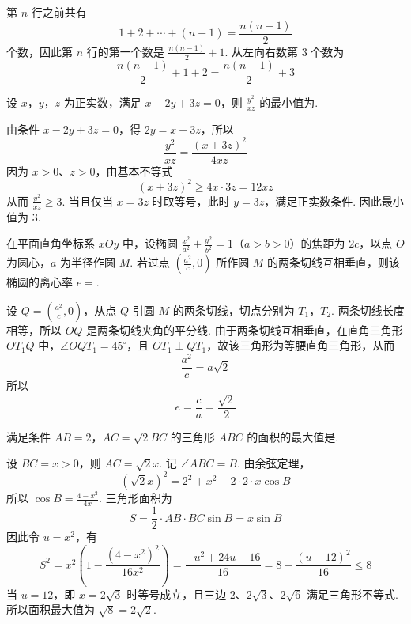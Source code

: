 
\begin{solution}
第 \(n\) 行之前共有
\[
1+2+\cdots+(n-1)=\frac{n(n-1)}{2}
\]
个数，因此第 \(n\) 行的第一个数是 \(\frac{n(n-1)}{2}+1\). 从左向右数第 \(3\) 个数为
\[
\frac{n(n-1)}{2}+1+2=\frac{n(n-1)}{2}+3
\]
\end{solution}

\begin{problem}
设 \(x\)，\(y\)，\(z\) 为正实数，满足 \(x - 2y + 3z = 0\)，则 \(\frac{y^2}{xz}\) 的最小值为\fillinblank{}.
\end{problem}


\begin{solution}
由条件 \(x-2y+3z=0\)，得 \(2y=x+3z\)，所以
\[
\frac{y^2}{xz}=\frac{(x+3z)^2}{4xz}
\]
因为 \(x>0\)、\(z>0\)，由基本不等式
\[
(x+3z)^2\geqslant4x\cdot3z=12xz
\]
从而 \(\frac{y^2}{xz}\geqslant3\). 当且仅当 \(x=3z\) 时取等号，此时 \(y=3z\)，满足正实数条件. 因此最小值为 \(3\).
\end{solution}

\begin{problem}
在平面直角坐标系 \(xOy\) 中，设椭圆 \(\frac{x^2}{a^2} + \frac{y^2}{b^2} = 1\)（\(a > b > 0\)）的焦距为 \(2c\)，以点 \(O\) 为圆心，\(a\) 为半径作圆 \(M\). 若过点 \(\left(\frac{a^2}{c}, 0\right)\) 所作圆 \(M\) 的两条切线互相垂直，则该椭圆的离心率 \(e = \)\fillinblank{}.
\end{problem}


\begin{solution}
设 \(Q=\left(\frac{a^2}{c},0\right)\)，从点 \(Q\) 引圆 \(M\) 的两条切线，切点分别为 \(T_1\)，\(T_2\). 两条切线长度相等，所以 \(OQ\) 是两条切线夹角的平分线. 由于两条切线互相垂直，在直角三角形 \(OT_1Q\) 中，\(\angle OQT_1=45^{\circ}\)，且 \(OT_1\perp QT_1\)，故该三角形为等腰直角三角形，从而
\[
\frac{a^2}{c}=a\sqrt2
\]
所以
\[
e=\frac{c}{a}=\frac{\sqrt2}{2}
\]
\end{solution}

\begin{problem}
满足条件 \(AB = 2\)，\(AC = \sqrt{2}BC\) 的三角形 \(ABC\) 的面积的最大值是\fillinblank{}.
\end{problem}


\begin{solution}
设 \(BC=x>0\)，则 \(AC=\sqrt2x\). 记 \(\angle ABC=B\). 由余弦定理，
\[
(\sqrt2x)^2=2^2+x^2-2\cdot2\cdot x\cos B
\]
所以 \(\cos B=\frac{4-x^2}{4x}\). 三角形面积为
\[
S=\frac12\cdot AB\cdot BC\sin B=x\sin B
\]
因此令 \(u=x^2\)，有
\[
S^2=x^2\left(1-\frac{(4-x^2)^2}{16x^2}\right)
 =\frac{-u^2+24u-16}{16}
 =8-\frac{(u-12)^2}{16}\leqslant8
\]
当 \(u=12\)，即 \(x=2\sqrt3\) 时等号成立，且三边 \(2\)、\(2\sqrt3\)、\(2\sqrt6\) 满足三角形不等式. 所以面积最大值为 \(\sqrt8=2\sqrt2\).
\end{solution}

